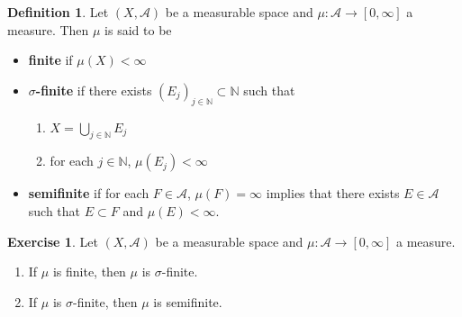 \documentclass{book}
\theoremstyle{definition}
\newtheorem{defn}[definition]{Definition}
\newtheorem{ex}[definition]{Exercise}
\newcommand{\sig}{\sigma}
\newcommand{\N}{\mathbb{N}}
\newcommand{\MA}{\mathcal{A}}
\DeclareMathOperator*{\0}{\mbf{0}}
\DeclareMathOperator*{\1}{\mbf{1}}
\begin{document}
	\begin{defn}
		Let $(X, \MA)$ be a measurable space and $\mu: \MA \rightarrow [0, \infty]$ a measure. Then $\mu$ is said to be 
		\begin{itemize}
			\item \textbf{finite} if $\mu(X) < \infty$
			\item \textbf{$\sig$-finite} if there exists $(E_j)_{j \in \N} \subset \N$ such that 
			\begin{enumerate}
				\item $X = \bigcup\limits_{j \in \N} E_j$
				\item for each $j \in \N$, $\mu(E_j) < \infty$
			\end{enumerate}
			\item \textbf{semifinite} if for each $F \in \MA$, $\mu(F) = \infty$ implies that there exists $E \in \MA$ such that $E \subset F$ and $\mu(E) < \infty$.
		\end{itemize}
	\end{defn}

	\begin{ex}
		Let $(X, \MA)$ be a measurable space and $\mu: \MA \rightarrow [0, \infty]$ a measure. 
		\begin{enumerate}
			\item If $\mu$ is finite, then $\mu$ is $\sig$-finite. 
			\item If $\mu$ is $\sig$-finite, then $\mu$ is semifinite.
		\end{enumerate}
	\end{ex}
\end{document}
